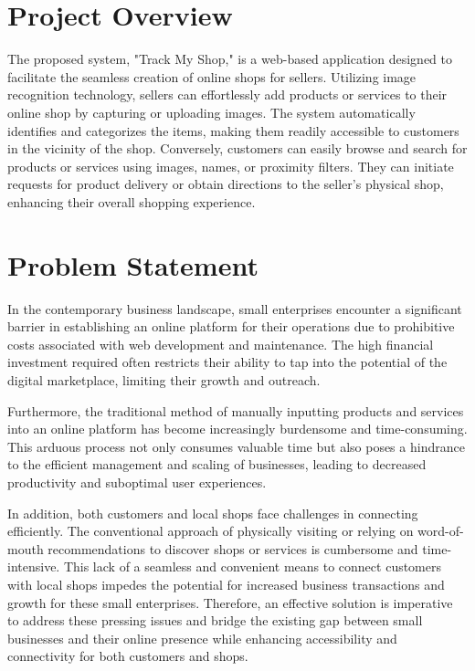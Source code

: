 \vspace{0.5cm}
\section{Project Overview}
The proposed system, "Track My Shop," is a web-based application designed to facilitate the seamless creation of online shops for sellers. Utilizing image recognition technology, sellers can effortlessly add products or services to their online shop by capturing or uploading images. The system automatically identifies and categorizes the items, making them readily accessible to customers in the vicinity of the shop. Conversely, customers can easily browse and search for products or services using images, names, or proximity filters. They can initiate requests for product delivery or obtain directions to the seller's physical shop, enhancing their overall shopping experience.

\vspace{0.5cm}
\section{Problem Statement}
In the contemporary business landscape, small enterprises encounter a significant barrier in establishing an online platform for their operations due to prohibitive costs associated with web development and maintenance. The high financial investment required often restricts their ability to tap into the potential of the digital marketplace, limiting their growth and outreach.

Furthermore, the traditional method of manually inputting products and services into an online platform has become increasingly burdensome and time-consuming. This arduous process not only consumes valuable time but also poses a hindrance to the efficient management and scaling of businesses, leading to decreased productivity and suboptimal user experiences.

In addition, both customers and local shops face challenges in connecting efficiently. The conventional approach of physically visiting or relying on word-of-mouth recommendations to discover shops or services is cumbersome and time-intensive. This lack of a seamless and convenient means to connect customers with local shops impedes the potential for increased business transactions and growth for these small enterprises. Therefore, an effective solution is imperative to address these pressing issues and bridge the existing gap between small businesses and their online presence while enhancing accessibility and connectivity for both customers and shops.

